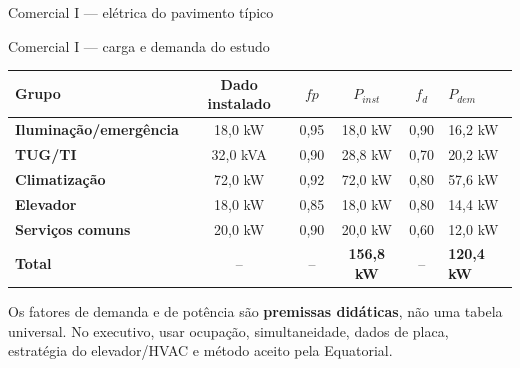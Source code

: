 \begin{frame}{Comercial I — elétrica do pavimento típico}
\centering{}\end{frame}

\begin{frame}[shrink=5]{Comercial I — carga e demanda do estudo}
\scriptsize
\begin{tabularx}{\textwidth}{>{\bfseries}p{3.0cm}c c c c X}
\toprule
Grupo & Dado instalado & $fp$ & $P_{inst}$ & $f_d$ & $P_{dem}$\\
\midrule
Iluminação/emergência & 18,0 kW & 0,95 & 18,0 kW & 0,90 & 16,2 kW\\
TUG/TI & 32,0 kVA & 0,90 & 28,8 kW & 0,70 & 20,2 kW\\
Climatização & 72,0 kW & 0,92 & 72,0 kW & 0,80 & 57,6 kW\\
Elevador & 18,0 kW & 0,85 & 18,0 kW & 0,80 & 14,4 kW\\
Serviços comuns & 20,0 kW & 0,90 & 20,0 kW & 0,60 & 12,0 kW\\
\midrule
\textbf{Total} & -- & -- & \textbf{156,8 kW} & -- & \textbf{120,4 kW}\\
\bottomrule
\end{tabularx}
\begin{caixaAt}
Os fatores de demanda e de potência são \textbf{premissas didáticas}, não uma tabela universal. No executivo, usar ocupação, simultaneidade, dados de placa, estratégia do elevador/HVAC e método aceito pela Equatorial.
\end{caixaAt}
\end{frame}

